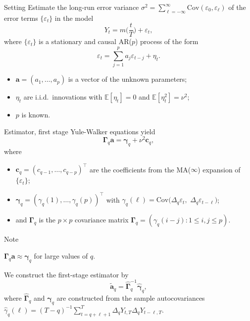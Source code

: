 \documentclass[10pt]{beamer}
\newcommand{\E}{\mathbb{E}}
\newcommand{\Cov}{\mathrm{Cov}}
\begin{document}
\begin{frame}{Setting}
Estimate the long-run error variance $\sigma^2 = \sum\nolimits_{\ell=-\infty}^{\infty} \Cov(\varepsilon_0,\varepsilon_{\ell})$ of the error terms $\{\varepsilon_t\}$ in the model 
\begin{equation*}
Y_t = m \Big( \frac{t}{T} \Big) + \varepsilon_t, 
\end{equation*}
where $\{\varepsilon_t\}$ is a stationary and causal AR($p$) process of the form 
\begin{equation*}
\varepsilon_t = \sum_{j=1}^p a_j \varepsilon_{t-j} + \eta_t. 
\end{equation*} \pause
\begin{itemize}
	\item $\boldsymbol{a} = (a_1,\ldots,a_p)$ is a vector of the unknown parameters;\pause
	\item $\eta_t$ are i.i.d.\ innovations with $\E[\eta_t] = 0$ and $\E[\eta_t^2] = \nu^2$;\pause
	\item $p$ is known.
\end{itemize}
\end{frame}

\begin{frame}{Estimator, first stage}
Yule-Walker equations yield 
\begin{equation*}\label{YU-eq}
\boldsymbol{\Gamma}_q \boldsymbol{a} = \boldsymbol{\gamma}_q + \nu^2 \boldsymbol{c}_q,  
\end{equation*} 
where
\vspace{-3mm}
\begin{itemize}
	\item $\boldsymbol{c}_q = (c_{q-1},\dots,c_{q-p})^\top$ are the coefficients from the MA($\infty$) expansion of $\{ \varepsilon_t \}$;\pause
	\item $\boldsymbol{\gamma}_q = (\gamma_q(1),\dots,\gamma_q(p))^\top$ with $\gamma_q(\ell) = \Cov(\Delta_q \varepsilon_t,$ $\Delta_q \varepsilon_{t-\ell})$;\pause
	\item and $\boldsymbol{\Gamma}_q$ is the $p \times p$ covariance matrix $\boldsymbol{\Gamma}_q = (\gamma_q(i-j): 1 \le i,j \le p)$.
\end{itemize}\pause
\begin{block}{Note}
\vspace{-3mm}
\begin{center}
$\boldsymbol{\Gamma}_q \boldsymbol{a} \approx \boldsymbol{\gamma}_q$ for large values of $q$.
\end{center}\vspace{-3mm}\end{block}\pause
\vspace{-3mm}

We construct the first-stage estimator by
\begin{equation*}
\widetilde{\boldsymbol{a}}_q = \widehat{\boldsymbol{\Gamma}}_q^{-1} \widehat{\boldsymbol{\gamma}}_q, 
\end{equation*}
where $\widehat{\boldsymbol{\Gamma}}_q$ and $\widehat{\boldsymbol{\gamma}}_q$ are constructed from the sample autocovariances $\widehat{\gamma}_q(\ell) = (T-q)^{-1} \sum_{t=q+\ell+1}^T \Delta_q Y_{t,T} \Delta_q Y_{t-\ell,T}$. 
\end{frame}
\end{document}
